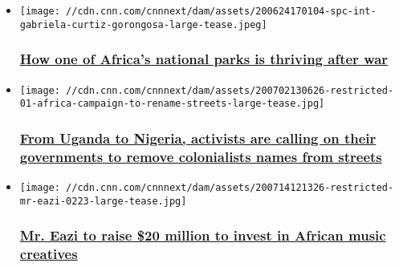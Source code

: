 \begin{itemize}
\item
  \href{/travel/article/inside-africa-gorongosa-national-park-spc-intl/index.html}{}

  \texttt{[image: //cdn.cnn.com/cnnnext/dam/assets/200624170104-spc-int-gabriela-curtiz-gorongosa-large-tease.jpeg]}

  \hypertarget{-how-one-of-africas-national-parks-is-thriving-after-war}{%
  \subsubsection{\texorpdfstring{\href{/travel/article/inside-africa-gorongosa-national-park-spc-intl/index.html}{
  How one of Africa's national parks is thriving after
  war}}{ How one of Africa's national parks is thriving after war}}\label{-how-one-of-africas-national-parks-is-thriving-after-war}}
\end{itemize}

\begin{itemize}
\item
  \href{/2020/07/03/africa/africa-campaign-rename-streets-intl/index.html}{}

  \texttt{[image: //cdn.cnn.com/cnnnext/dam/assets/200702130626-restricted-01-africa-campaign-to-rename-streets-large-tease.jpg]}

  \hypertarget{from-uganda-to-nigeria-activists-are-calling-on-their-governments-to-remove-colonialists-names-from-streets}{%
  \subsubsection{\texorpdfstring{\href{/2020/07/03/africa/africa-campaign-rename-streets-intl/index.html}{From
  Uganda to Nigeria, activists are calling on their governments to
  remove colonialists names from
  streets}}{From Uganda to Nigeria, activists are calling on their governments to remove colonialists names from streets}}\label{from-uganda-to-nigeria-activists-are-calling-on-their-governments-to-remove-colonialists-names-from-streets}}
\end{itemize}

\begin{itemize}
\item
  \href{/2020/07/17/africa/mr-eazi-africa-music-fund-intl/index.html}{}

  \texttt{[image: //cdn.cnn.com/cnnnext/dam/assets/200714121326-restricted-mr-eazi-0223-large-tease.jpg]}

  \hypertarget{mr-eazi-to-raise-20-million-to-invest-in-african-music-creatives}{%
  \subsubsection{\texorpdfstring{\href{/2020/07/17/africa/mr-eazi-africa-music-fund-intl/index.html}{Mr.
  Eazi to raise \$20 million to invest in African music
  creatives}}{Mr. Eazi to raise \$20 million to invest in African music creatives}}\label{mr-eazi-to-raise-20-million-to-invest-in-african-music-creatives}}
\end{itemize}

